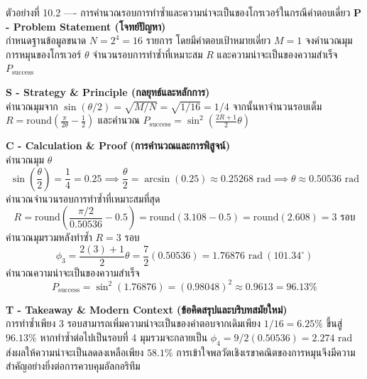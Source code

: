 \begin{psctbox}{ตัวอย่างที่ 10.2 ---- การคำนวณรอบการทำซ้ำและความน่าจะเป็นของโกรเวอร์ในกรณีคำตอบเดี่ยว}
\noindent\textbf{P - Problem Statement (โจทย์ปัญหา)} \\
กำหนดฐานข้อมูลขนาด $N = 2^4 = 16$ รายการ โดยมีคำตอบเป้าหมายเดี่ยว $M = 1$ จงคำนวณมุมการหมุนของโกรเวอร์ $\theta$ จำนวนรอบการทำซ้ำที่เหมาะสม $R$ และความน่าจะเป็นของความสำเร็จ $P_{\text{success}}$

\vspace{4pt}
\noindent\textbf{S - Strategy \& Principle (กลยุทธ์และหลักการ)} \\
คำนวณมุมจาก $\sin(\theta/2) = \sqrt{M/N} = \sqrt{1/16} = 1/4$ จากนั้นหาจำนวนรอบเต็ม $R = \text{round}\left(\frac{\pi}{2\theta} - \frac{1}{2}\right)$ และคำนวณ $P_{\text{success}} = \sin^2\left(\frac{2R+1}{2}\theta\right)$

\vspace{4pt}
\noindent\textbf{C - Calculation \& Proof (การคำนวณและการพิสูจน์)} \\
คำนวณมุม $\theta$
\begin{equation}
\sin\left(\frac{\theta}{2}\right) = \frac{1}{4} = 0.25 \implies \frac{\theta}{2} = \arcsin(0.25) \approx 0.25268\text{ rad} \implies \theta \approx 0.50536\text{ rad}
\end{equation}
คำนวณจำนวนรอบการทำซ้ำที่เหมาะสมที่สุด
\begin{equation}
R = \text{round}\left( \frac{\pi/2}{0.50536} - 0.5 \right) = \text{round}(3.108 - 0.5) = \text{round}(2.608) = 3\text{ รอบ}
\end{equation}
คำนวณมุมรวมหลังทำซ้ำ $R=3$ รอบ
\begin{equation}
\phi_3 = \frac{2(3)+1}{2}\theta = \frac{7}{2}(0.50536) = 1.76876\text{ rad} \ (101.34^\circ)
\end{equation}
คำนวณความน่าจะเป็นของความสำเร็จ
\begin{equation}
P_{\text{success}} = \sin^2(1.76876) = (0.98048)^2 \approx 0.9613 = 96.13\%
\end{equation}

\vspace{4pt}
\noindent\textbf{T - Takeaway \& Modern Context (ข้อคิดสรุปและบริบทสมัยใหม่)} \\
การทำซ้ำเพียง 3 รอบสามารถเพิ่มความน่าจะเป็นของคำตอบจากเดิมเพียง $1/16 = 6.25\%$ ขึ้นสู่ $96.13\%$ หากทำซ้ำต่อไปเป็นรอบที่ 4 มุมรวมจะกลายเป็น $\phi_4 = 9/2(0.50536) = 2.274\text{ rad}$ ส่งผลให้ความน่าจะเป็นลดลงเหลือเพียง $58.1\%$ การเข้าใจพลวัตเชิงเรขาคณิตของการหมุนจึงมีความสำคัญอย่างยิ่งต่อการควบคุมอัลกอริทึม
\end{psctbox}


